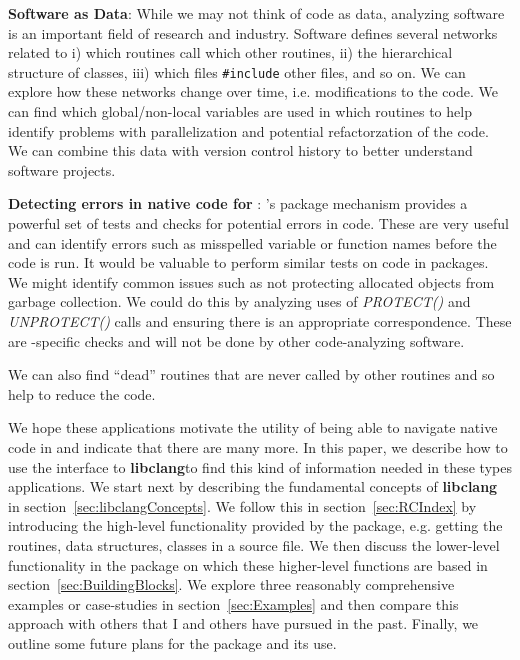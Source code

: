 \documentclass[article]{jss}
\def\C{\proglang{C}}
\def\Cpp{\proglang{C$++$}}
\def\R{\proglang{R}}
\def\Rpkg#1{\pkg{#1}}
\def\Cfunc#1{\textit{#1()}}
\def\libclang{\textbf{libclang}}
\begin{document}
\textbf{Software as Data}: While we may not think of code as data,
analyzing software is an important field of research and industry.
Software defines several networks related to i) which routines call
which other routines, ii) the hierarchical structure of \Cpp{}
classes, iii) which files \texttt{\#include} other files, and so on.
We can explore how these networks change over time, i.e. modifications
to the code. We can find which global/non-local variables are used in
which routines to help identify problems with parallelization and
potential refactorzation of the code.  We can combine this data with
version control history to better understand software projects.


\textbf{Detecting errors in native code for \R}: \R's package
mechanism provides a powerful set of tests and checks for potential
errors in \R{} code.  These are very useful and can identify errors
such as misspelled variable or function names before the code is run.
It would be valuable to perform similar tests on \C{} code in \R{}
packages.  We might identify common issues such as not protecting
allocated \R{} objects from garbage collection.  We could do this by
analyzing uses of \Cfunc{PROTECT} and \Cfunc{UNPROTECT} calls and
ensuring there is an appropriate correspondence.  These are
\R-specific checks and will not be done by other code-analyzing
software.


We can also find ``dead'' routines that are never called by other
routines and so help to reduce the code.

We hope these applications motivate the utility of being able to
navigate native code in \R and indicate that there are many more.  In
this paper, we describe how to use the \R{} interface to \libclang to
find this kind of information needed in these types applications.  We
start next by describing the fundamental concepts of \libclang{} in
section~\ref{sec:libclangConcepts}.  We follow this in
section~\ref{sec:RCIndex} by introducing the high-level functionality
provided by the \Rpkg{RCIndex} package, e.g. getting the routines,
data structures, \Cpp{} classes in a source file.  We then discuss the
lower-level functionality in the package on which these higher-level
functions are based in section~\ref{sec:BuildingBlocks}.  We explore
three reasonably comprehensive examples or case-studies in
section~\ref{sec:Examples} and then compare this approach with others
that I and others have pursued in the past.  Finally, we outline some
future plans for the package and its use.
\end{document}
